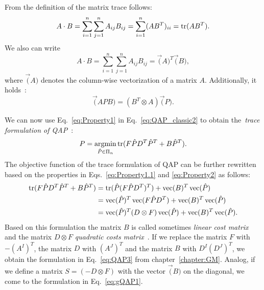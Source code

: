 From the definition of the matrix trace follows:
\begin{equation}\label{eq:Property1}
A\cdot B=\sum_{i=1}^{n}\sum_{j=1}^{n}A_{ij}B_{ij}=\sum_{i=1}^{n}(AB^T)_{ii}=\mathop{\rm tr}(AB^T).
\end{equation}
We also can write
\begin{equation}\label{eq:Property1.1}
A\cdot B=\sum_{i=1}^{n}\sum_{j=1}^{n}A_{ij}B_{ij}=\vec(A)^T\vec(B),
\end{equation}
where $\vec(A)$ denotes the column-wise vectorization of a matrix $A$. Additionally, it holds~\cite{Jain1989}:
\begin{equation}\label{eq:Property2}
\vec(APB)=(B^T\otimes A)\vec(P).
\end{equation}

We can now use Eq.~\eqref{eq:Property1} in Eq.~\eqref{eq:QAP_classic2} to obtain the~\emph{trace formulation of QAP}~\cite{Burkard98thequadratic}:
\begin{equation}\label{eq:QAP_classic3}
P = \mathop{\rm argmin}_{\hat{P}\in\Pi_n}\mathop{\rm tr}(F\hat{P}D^T\hat{P}^T+B\hat{P}^T).
\end{equation}
The objective function of the trace formulation of QAP can be further rewritten based on the properties in Eqs.~\eqref{eq:Property1.1} and \eqref{eq:Property2} as follows:
 \begin{align}\label{eq:QAP_classic4}
\mathop{\rm tr}(F\hat{P}D^T\hat{P}^T+B\hat{P}^T)&=\mathop{\rm tr}(\hat{P}(F\hat{P}D^T)^T)+\mathop{\rm vec}(B)^T\mathop{\rm vec}(\hat{P}) \notag\\	
									&=\mathop{\rm vec}(\hat{P})^T\mathop{\rm vec}(F\hat{P}D^T)+\mathop{\rm vec}(B)^T\mathop{\rm vec}(\hat{P}) \notag\\	
                                    &=\mathop{\rm vec}(\hat{P})^T(D\otimes F)\mathop{\rm vec}({\hat{P}})+\mathop{\rm vec}(B)^T\mathop{\rm vec}(\hat{P}).
\end{align}
Based on this formulation the matrix $B$ is called sometimes \emph{linear cost matrix} and the matrix $D\otimes F$ \emph{quadratic costs matrix}~\cite{Burkard98thequadratic,Roth2001}. If we replace the matrix $F$ with $-(A^I)^T$, the matrix $D$ with $(A^J)^T$ and the matrix $B$ with $D^I(D^J)^T$, we obtain the formulation in Eq.~\eqref{eq:QAP3} from chapter~\ref{chapter:GM}. Analog, if we define a matrix $S=(-D\otimes F)$ with the vector $\vec(B)$ on the diagonal, we come to the formulation in Eq.~\eqref{eq:gQAP1}.

